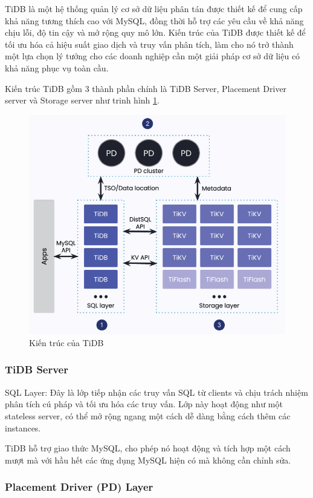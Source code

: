 \documentclass{article}[13pt]
\begin{document}
TiDB \cite{huang2020tidb} là một hệ thống quản lý cơ sở dữ liệu phân tán được thiết kế để cung cấp khả năng tương thích cao với MySQL, đồng thời hỗ trợ các yêu cầu về khả năng chịu lỗi, độ tin cậy và mở rộng quy mô lớn. Kiến trúc của TiDB được thiết kế để tối ưu hóa cả hiệu suất giao dịch và truy vấn phân tích, làm cho nó trở thành một lựa chọn lý tưởng cho các doanh nghiệp cần một giải pháp cơ sở dữ liệu có khả năng phục vụ toàn cầu.

Kiến trúc TiDB gồm 3 thành phần chính là TiDB Server, Placement Driver server và Storage server như trinh hình \ref{fig:TiDBArchiteture}.


\begin{figure}
    \centering
    \includegraphics[width=0.6\linewidth]{TiDBArchiteture.png}
    \caption{Kiến trúc của TiDB\protect\footnotemark}
    \label{fig:TiDBArchiteture}
\end{figure}




\subsubsection{TiDB Server}

SQL Layer: Đây là lớp tiếp nhận các truy vấn SQL từ clients và chịu trách nhiệm phân tích cú pháp và tối ưu hóa các truy vấn. Lớp này hoạt động như một stateless server, có thể mở rộng ngang một cách dễ dàng bằng cách thêm các instances.

TiDB hỗ trợ giao thức MySQL, cho phép nó hoạt động và tích hợp một cách mượt mà với hầu hết các ứng dụng MySQL hiện có mà không cần chỉnh sửa.

\subsubsection{Placement Driver (PD) Layer}
\end{document}
